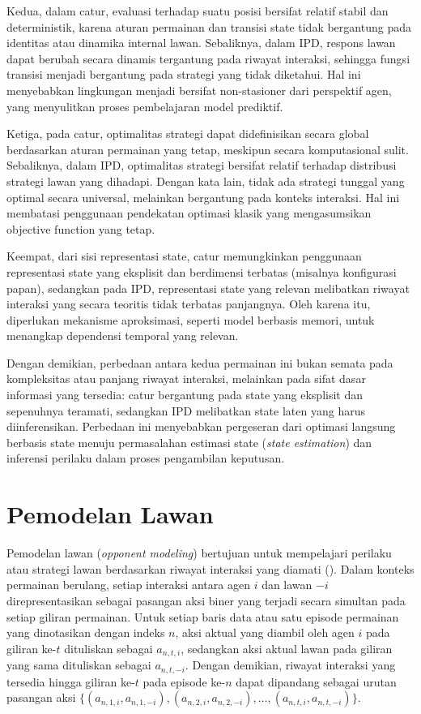 Kedua, dalam catur, evaluasi terhadap suatu posisi bersifat relatif stabil dan deterministik, karena aturan permainan dan transisi state tidak bergantung pada identitas atau dinamika internal lawan. Sebaliknya, dalam IPD, respons lawan dapat berubah secara dinamis tergantung pada riwayat interaksi, sehingga fungsi transisi menjadi bergantung pada strategi yang tidak diketahui. Hal ini menyebabkan lingkungan menjadi bersifat non-stasioner dari perspektif agen, yang menyulitkan proses pembelajaran model prediktif.

Ketiga, pada catur, optimalitas strategi dapat didefinisikan secara global berdasarkan aturan permainan yang tetap, meskipun secara komputasional sulit. Sebaliknya, dalam IPD, optimalitas strategi bersifat relatif terhadap distribusi strategi lawan yang dihadapi. Dengan kata lain, tidak ada strategi tunggal yang optimal secara universal, melainkan bergantung pada konteks interaksi. Hal ini membatasi penggunaan pendekatan optimasi klasik yang mengasumsikan objective function yang tetap.

Keempat, dari sisi representasi state, catur memungkinkan penggunaan representasi state yang eksplisit dan berdimensi terbatas (misalnya konfigurasi papan), sedangkan pada IPD, representasi state yang relevan melibatkan riwayat interaksi yang secara teoritis tidak terbatas panjangnya. Oleh karena itu, diperlukan mekanisme aproksimasi, seperti model berbasis memori, untuk menangkap dependensi temporal yang relevan.

Dengan demikian, perbedaan antara kedua permainan ini bukan semata pada kompleksitas atau panjang riwayat interaksi, melainkan pada sifat dasar informasi yang tersedia: catur bergantung pada state yang eksplisit dan sepenuhnya teramati, sedangkan IPD melibatkan state laten yang harus diinferensikan. Perbedaan ini menyebabkan pergeseran dari optimasi langsung berbasis state menuju permasalahan estimasi state (\textit{state estimation}) dan inferensi perilaku dalam proses pengambilan keputusan.

\section{Pemodelan Lawan}

Pemodelan lawan (\textit{opponent modeling}) bertujuan untuk mempelajari perilaku atau strategi lawan berdasarkan riwayat interaksi yang diamati (\cite{shoham_multiagent_2009}). Dalam konteks permainan berulang, setiap interaksi antara agen $i$ dan lawan $-i$ direpresentasikan sebagai pasangan aksi biner yang terjadi secara simultan pada setiap giliran permainan. Untuk setiap baris data atau satu episode permainan yang dinotasikan dengan indeks $n$, aksi aktual yang diambil oleh agen $i$ pada giliran ke-$t$ dituliskan sebagai $a_{n,t,i}$, sedangkan aksi aktual lawan pada giliran yang sama dituliskan sebagai $a_{n,t,-i}$. Dengan demikian, riwayat interaksi yang tersedia hingga giliran ke-$t$ pada episode ke-$n$ dapat dipandang sebagai urutan pasangan aksi $\{(a_{n,1,i}, a_{n,1,-i}), (a_{n,2,i}, a_{n,2,-i}), \dots, (a_{n,t,i}, a_{n,t,-i})\}$.

